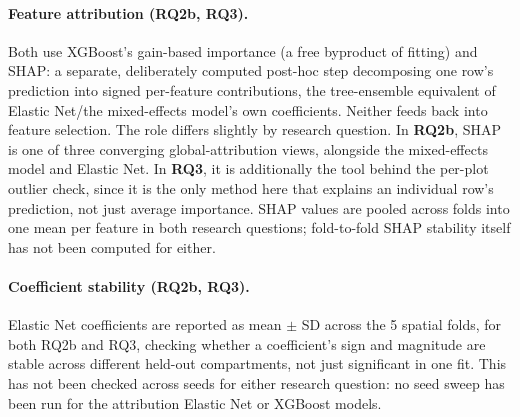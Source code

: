 \documentclass[11pt,a4paper]{report}
\begin{document}
\paragraph*{Feature attribution (RQ2b, RQ3).}
Both use XGBoost's gain-based importance (a free byproduct of fitting) and SHAP: a separate,
deliberately computed post-hoc step decomposing one row's prediction into signed per-feature
contributions, the tree-ensemble equivalent of Elastic Net/the mixed-effects model's own
coefficients. Neither feeds back into feature selection. The role differs slightly by research
question. In \textbf{RQ2b}, SHAP is one of three converging global-attribution views, alongside
the mixed-effects model and Elastic Net. In \textbf{RQ3}, it is additionally the tool behind the
per-plot outlier check, since it is the only method here that explains an individual row's
prediction, not just average importance. SHAP values are pooled across folds into one mean per
feature in both research questions; fold-to-fold SHAP stability itself has not been computed for
either.

\paragraph*{Coefficient stability (RQ2b, RQ3).}
Elastic Net coefficients are reported as mean $\pm$ SD across the 5 spatial folds, for both RQ2b
and RQ3, checking whether a coefficient's sign and magnitude are stable across different held-out
compartments, not just significant in one fit. This has not been checked across seeds for either
research question: no seed sweep has been run for the attribution Elastic Net or XGBoost models.
\end{document}
